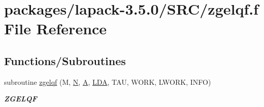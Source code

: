 \hypertarget{zgelqf_8f}{}\section{packages/lapack-\/3.5.0/\+S\+R\+C/zgelqf.f File Reference}
\label{zgelqf_8f}
\subsection*{Functions/\+Subroutines}
\begin{DoxyCompactItemize}
\item 
subroutine \hyperlink{group__complex16GEcomputational_ga1ebfa1dc59e0f38a3e2eafd01e205fdb}{zgelqf} (M, \hyperlink{polmisc_8c_a0240ac851181b84ac374872dc5434ee4}{N}, \hyperlink{classA}{A}, \hyperlink{example__user_8c_ae946da542ce0db94dced19b2ecefd1aa}{L\+D\+A}, T\+A\+U, W\+O\+R\+K, L\+W\+O\+R\+K, I\+N\+F\+O)
\begin{DoxyCompactList}\small\item\em {\bfseries Z\+G\+E\+L\+Q\+F} \end{DoxyCompactList}\end{DoxyCompactItemize}
